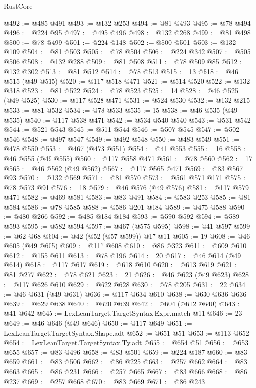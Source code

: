 \begin{lexlean}{RustCore}
\begin{coremodule}
@492 := @485 @491
@493 := @132 @253
@494 := @81 @493
@495 := @78 @494
@496 := @224 @95
@497 := @495 @496
@498 := @132 @268
@499 := @81 @498
@500 := @78 @499
@501 := @224 @148
@502 := @500 @501
@503 := @132 @109
@504 := @81 @503
@505 := @78 @504
@506 := @224 @342
@507 := @505 @506
@508 := @132 @288
@509 := @81 @508
@511 := @78 @509 @85
@512 := @132 @302
@513 := @81 @512
@514 := @78 @513
@515 := 13
@518 := @46 @515 (@49 @515)
@520 := @117 @518 @471
@521 := @514 @520
@522 := @132 @318
@523 := @81 @522
@524 := @78 @523
@525 := 14
@528 := @46 @525 (@49 @525)
@530 := @117 @528 @471
@531 := @524 @530
@532 := @132 @215
@533 := @81 @532
@534 := @78 @533
@535 := 15
@538 := @46 @535 (@49 @535)
@540 := @117 @538 @471
@542 := @534 @540 @540
@543 := @531 @542
@544 := @521 @543
@545 := @511 @544
@546 := @507 @545
@547 := @502 @546
@548 := @497 @547
@549 := @492 @548
@550 := @483 @549
@551 := @478 @550
@553 := @467 (@473 @551)
@554 := @41 @553
@555 := 16
@558 := @46 @555 (@49 @555)
@560 := @117 @558 @471
@561 := @78 @560
@562 := 17
@565 := @46 @562 (@49 @562)
@567 := @117 @565 @471
@569 := @83 @567 @93
@570 := @132 @569
@571 := @81 @570
@573 := @561 @571 @171
@575 := @78 @573 @91
@576 := 18
@579 := @46 @576 (@49 @576)
@581 := @117 @579 @471
@582 := @469 @581
@583 := @83 @491
@584 := @583 @253
@585 := @81 @584
@586 := @78 @585
@588 := @586 @201 @184
@589 := @475 @588
@590 := @480 @266
@592 := @485 @184 @184
@593 := @590 @592
@594 := @589 @593
@595 := @582 @594
@597 := @467 (@575 @595)
@598 := @41 @597
@599 := @62 @68
@604 := @42 (@52 (@57 @599)) @17 @11
@605 := 19
@608 := @46 @605 (@49 @605)
@609 := @117 @608
@610 := @86 @323
@611 := @609 @610
@612 := @155 @611
@613 := @78 @196
@614 := 20
@617 := @46 @614 (@49 @614)
@618 := @117 @617
@619 := @618 @610
@620 := @613 @619
@621 := @81 @277
@622 := @78 @621
@623 := 21
@626 := @46 @623 (@49 @623)
@628 := @117 @626 @610
@629 := @622 @628
@630 := @78 @205
@631 := 22
@634 := @46 @631 (@49 @631)
@636 := @117 @634 @610
@638 := @630 @636 @636
@639 := @629 @638
@640 := @620 @639
@642 := @604 (@612 @640)
@643 := @41 @642
@645 := LexLeanTarget.TargetSyntax.Expr.match @11
@646 := 23
@649 := @46 @646 (@49 @646)
@650 := @117 @649
@651 := LexLeanTarget.TargetSyntax.Shape.adt
@652 := @651 @51
@653 := @113 @652
@654 := LexLeanTarget.TargetSyntax.Ty.adt
@655 := @654 @51
@656 := @653 @655
@657 := @83 @496
@658 := @83 @501
@659 := @224 @187
@660 := @83 @659
@661 := @83 @506
@662 := @86 @225
@663 := @257 @662
@664 := @83 @663
@665 := @86 @231
@666 := @257 @665
@667 := @83 @666
@668 := @86 @237
@669 := @257 @668
@670 := @83 @669
@671 := @86 @243

\end{coremodule}
\end{lexlean}
